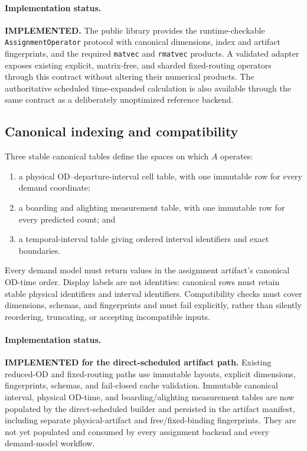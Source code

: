 \paragraph{Implementation status.}
\textbf{IMPLEMENTED.}  The public library provides the runtime-checkable
\texttt{AssignmentOperator} protocol with canonical dimensions, index and
artifact fingerprints, and the required \texttt{matvec} and \texttt{rmatvec}
products.  A validated adapter exposes existing explicit, matrix-free, and
sharded fixed-routing operators through this contract without altering their
numerical products.  The authoritative scheduled time-expanded calculation is
also available through the same contract as a deliberately unoptimized
reference backend.

\subsection{Canonical indexing and compatibility}

Three stable canonical tables define the spaces on which $A$ operates:
\begin{enumerate}
\item a physical OD--departure-interval cell table, with one immutable row for
  every demand coordinate;
\item a boarding and alighting measurement table, with one immutable row for
  every predicted count; and
\item a temporal-interval table giving ordered interval identifiers and exact
  boundaries.
\end{enumerate}
Every demand model must return values in the assignment artifact's canonical
OD-time order.  Display labels are not identities: canonical rows must retain
stable physical identifiers and interval identifiers.  Compatibility checks
must cover dimensions, schemas, and fingerprints and must fail explicitly,
rather than silently reordering, truncating, or accepting incompatible inputs.

\paragraph{Implementation status.}
\textbf{IMPLEMENTED for the direct-scheduled artifact path.}  Existing
reduced-OD and fixed-routing paths use immutable layouts, explicit dimensions,
fingerprints, schemas, and fail-closed cache validation.  Immutable canonical
interval, physical OD-time, and boarding/alighting measurement tables are now
populated by the direct-scheduled builder and persisted in the artifact
manifest, including separate physical-artifact and free/fixed-binding
fingerprints.  They are not yet populated and consumed by every assignment
backend and every demand-model workflow.


